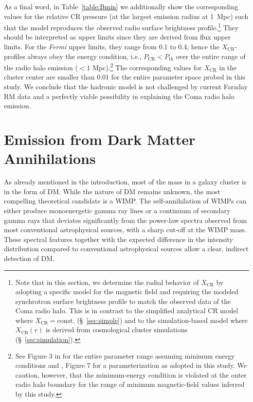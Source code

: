 \documentclass[12pt,manuscript]{aastex}
\def\Fermi{{\em Fermi}\xspace}
\newcommand{\rmn}{\mathrm}
\newcommand{\CR}{\mathrm{CR}}
\begin{document}
As a final word, in Table~\ref{table:Bmin} we additionally show the corresponding values for the
relative CR pressure (at the largest emission radius at 1~Mpc) such that the model reproduces the
observed radio surface brightness profile.\footnote{Note that in this section, we determine the
radial behavior of $X_\CR$ by adopting a specific model for the magnetic field and requiring the
modeled synchrotron surface brightness profile to match the observed data of the Coma radio
halo. This is in contrast to the simplified analytical CR model where $X_\CR=\rmn{const.}$
(\S~\ref{sec:simple}) and to the simulation-based model where $X_\CR(r)$ is derived from
cosmological cluster simulations (\S~\ref{sec:simulation}).} They should be interpreted as upper
limits since they are derived from flux upper limits. For the \Fermi upper limits, they range
from 0.1 to 0.4; hence the $X_{\CR}$-profiles always obey the energy condition, i.e., $P_{\CR} <
P_{\mathrm{th}}$ over the entire range of the radio halo emission ($< 1$ Mpc).\footnote{See Figure 3
in \citet{article:PfrommerEnsslin:2004a} for the entire parameter range assuming minimum energy
conditions and \citet{article:PfrommerEnsslin:2004b}, Figure 7 for a parameterization as adopted in
this study. We caution, however, that the minimum-energy condition is violated at the outer radio
halo boundary for the range of minimum magnetic-field values inferred by this study.} The
corresponding values for $X_\CR$ in the cluster center are smaller than 0.01 for the entire
parameter space probed in this study. We conclude that the hadronic model is not challenged by
current Faraday RM data and a perfectly viable possibility in explaining the Coma radio halo
emission.

%
%

\section{Emission from Dark Matter Annihilations}
As already mentioned in the introduction, most of the mass in a galaxy cluster is in the form of
DM. While the nature of DM remains unknown, the most compelling theoretical candidate is a
WIMP. The self-annihilation of WIMPs can either produce monoenergetic gamma ray lines or a
continuum of secondary gamma rays that deviates significantly from the power-law spectra observed
from most conventional astrophysical sources, with a sharp cut-off at the WIMP mass. These spectral
features together with the expected difference in the intensity distribution compared to
conventional astrophysical sources allow a clear, indirect detection of DM.
\end{document}

